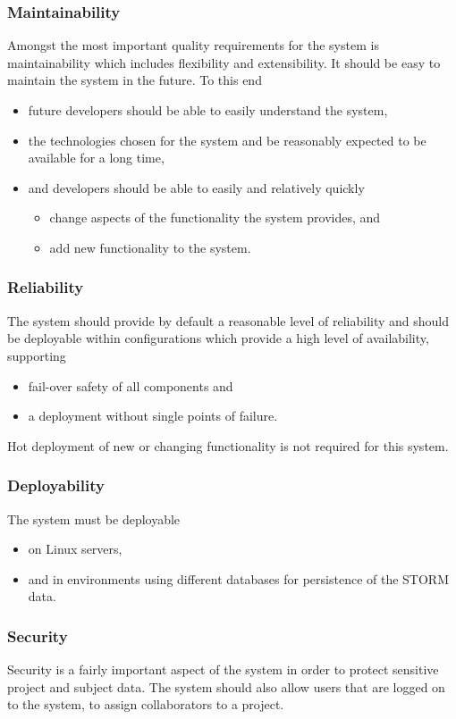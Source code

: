 \subsubsection{Maintainability} 
Amongst the most important quality requirements for the system is maintainability which includes flexibility and extensibility. It should be easy to maintain the system in the future. To this end
\begin{itemize}
\item future developers should be able to easily understand the system,
\item the technologies chosen for the system and be reasonably expected to be available for a long time,
\item and developers should be able to easily and relatively quickly
\begin{itemize}
\item change aspects of the functionality the system provides, and
\item add new functionality to the system.
\end{itemize}
\end{itemize}

\subsubsection{Reliability}
The system should provide by default a reasonable level of reliability and should be deployable within configurations which provide a high level of availability, supporting
\begin{itemize}
\item fail-over safety of all components and
\item a deployment without single points of failure.
\end{itemize}
Hot deployment of new or changing functionality is not required for this system.

\subsubsection{Deployability}
The system must be deployable
\begin{itemize}
\item on Linux servers,
\item and in environments using different databases for persistence of the STORM data.
\end{itemize}

\subsubsection{Security}
Security is a fairly important aspect of the system in order to protect sensitive project and subject data.
The system should also allow users that are logged on to the system, to assign collaborators
to a project. 


